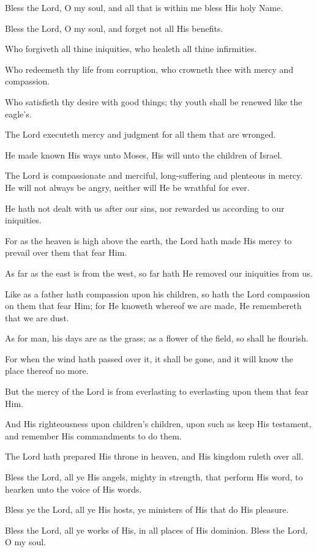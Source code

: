 Bless the Lord, O my soul, and all that is within me bless His holy Name.

Bless the Lord, O my soul, and forget not all His benefits.

Who forgiveth all thine iniquities, who healeth all thine infirmities.

Who redeemeth thy life from corruption, who crowneth thee with mercy and compassion.

Who satisfieth thy desire with good things; thy youth shall be renewed like the eagle's.

The Lord executeth mercy and judgment for all them that are wronged.

He made known His ways unto Moses, His will unto the children of Israel.

The Lord is compassionate and merciful, long-suffering and plenteous in mercy. He will not always be angry, neither will He be wrathful for ever.

He hath not dealt with us after our sins, nor rewarded us according to our iniquities.

For as the heaven is high above the earth, the Lord hath made His mercy to prevail over them that fear Him.

As far as the east is from the west, so far hath He removed our iniquities from us.

Like as a father hath compassion upon his children, so hath the Lord compassion on them that fear Him; for He knoweth whereof we are made, He remembereth that we are dust.

As for man, his days are as the grass; as a flower of the field, so shall he flourish.

For when the wind hath passed over it, it shall be gone, and it will know the place thereof no more.

But the mercy of the Lord is from everlasting to everlasting upon them that fear Him.

And His righteousness upon children's children, upon such as keep His testament, and remember His commandments to do them.

The Lord hath prepared His throne in heaven, and His kingdom ruleth over all.

Bless the Lord, all ye His angels, mighty in strength, that perform His word, to hearken unto the voice of His words.

Bless ye the Lord, all ye His hosts, ye ministers of His that do His pleasure.

Bless the Lord, all ye works of His, in all places of His dominion. Bless the Lord, O my soul.
